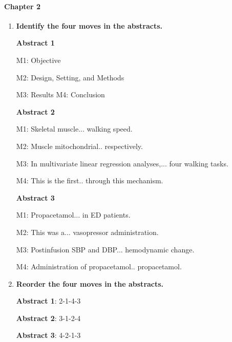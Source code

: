 \documentclass{ctexbook}
\begin{document}
\paragraph*{Chapter 2}\par
\begin{enumerate}
  \item \textbf{Identify the four moves in the abstracts.}
  
  \textbf{Abstract 1}

  \hspace*{2em}M1: Objective 

  \hspace*{2em}M2: Design, Setting, and Methods 

  \hspace*{2em}M3: Results M4: Conclusion 
  
  \textbf{Abstract 2}

  \hspace*{2em}M1: Skeletal muscle... walking speed.

  \hspace*{2em}M2: Muscle mitochondrial.. respectively.

  \hspace*{2em}M3: In multivariate linear regression analyses,... four walking tasks.
  
  \hspace*{2em}M4: This is the first.. through this mechanism.
  
  \textbf{Abstract 3}
  
  \hspace*{2em}M1: Propacetamol... in ED patients.
  
  \hspace*{2em}M2: This was a... vasopressor administration.
  
  \hspace*{2em}M3: Postinfusion SBP and DBP... hemodynamic change.
  
  \hspace*{2em}M4: Administration of propacetamol.. propacetamol.
  
  \item \textbf{Reorder the four moves in the abstracts.}

  \textbf{Abstract 1}: 2-1-4-3
  
  \textbf{Abstract 2}: 3-1-2-4

  \textbf{Abstract 3}: 4-2-1-3

\end{enumerate}
\end{document}
